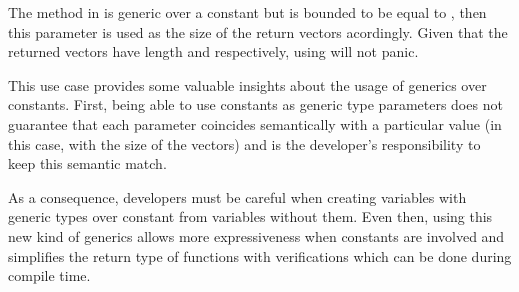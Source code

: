 The  method in  is generic
over a constant  but is bounded to be equal to , then
this parameter is used as the size of the return vectors acordingly. Given that
the returned vectors have length  and  respectively,
using  will not panic.

This use case provides some valuable insights about the usage of generics over
constants. First, being able to use constants as generic type parameters does
not guarantee that each parameter coincides semantically with a particular
value (in this case, with the size of the vectors) and is the developer's
responsibility to keep this semantic match. 

As a consequence, developers must be careful when creating variables with
generic types over constant from variables without them. Even then, using this
new kind of generics allows more expressiveness when constants are involved 
and simplifies the return type of functions with verifications which can be
done during compile time.
